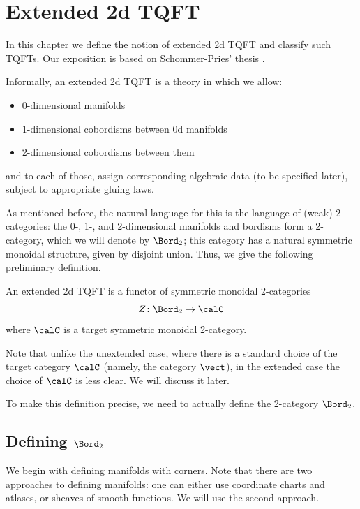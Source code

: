 \chapter{Extended 2d TQFT}\label{c:2d-extended}

In this chapter we define the notion of extended 2d TQFT and classify such
TQFTs. Our exposition is based on Schommer-Pries' thesis \cite{schommer-pries}.


Informally, an extended 2d TQFT is a theory in which we allow:
\begin{itemize}
  \item 0-dimensional manifolds
  \item 1-dimensional cobordisms between 0d manifolds
  \item 2-dimensional cobordisms between them
\end{itemize}
and to each of those, assign corresponding algebraic data (to be
specified later), subject to appropriate gluing laws.

As mentioned before, the natural language for this is the language of (weak)
2-categories: the 0-, 1-, and 2-dimensional manifolds and bordisms form a
2-category, which we will denote by $\Bord_2$; this category has a natural
symmetric monoidal structure, given by disjoint union. Thus, we give the
following preliminary definition.

\begin{predefinition}
  An extended 2d TQFT is a functor of symmetric monoidal 2-categories
  $$
    Z\colon \Bord_2\to \calC
  $$
  where $\calC$ is a target symmetric monoidal 2-category.
\end{predefinition}
Note that unlike the unextended case, where there is a standard choice of
the target category $\calC$ (namely, the category $\vect$), in the extended case
the choice of $\calC$ is less clear. We will discuss it later.

To make this definition precise, we need to actually define the
2-category $\Bord_2$.

\section{Defining $\Bord_2$}\label{s:defining-bord2}
We begin with defining manifolds with corners. Note that there are two
approaches to defining manifolds: one can either use coordinate charts and
atlases, or sheaves of smooth functions. We will use the second approach.

